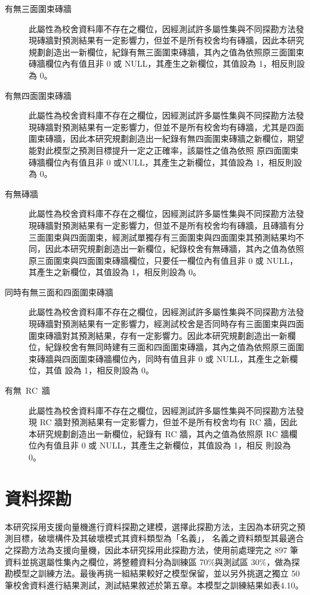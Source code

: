 \begin{description}
  \item[有無三面圍束磚牆]
  此屬性為校舍資料庫不存在之欄位，因經測試許多屬性集與不同探勘方法發現磚牆對預測結果有一定影響力，但並不是所有校舍均有磚牆，因此本研究規劃創造出一新欄位，紀錄有無三面圍束磚牆，其內之值為依照原三面圍束磚牆欄位內有值且非 0 或 NULL，其產生之新欄位，其值設為 1，相反則設為 0。
  \item[有無四面圍束磚牆]
  此屬性為校舍資料庫不存在之欄位，因經測試許多屬性集與不同探勘方法發現磚牆對預測結果有一定影響力，但並不是所有校舍均有磚牆，尤其是四面圍束磚牆，因此本研究規劃創造出一紀錄有無四面圍束磚牆之新欄位，期望能對此模型之預測目標提升一定之正確率，該屬性之值為依照 原四面圍束磚牆欄位內有值且非 0 或NULL，其產生之新欄位，其值設為 1，相反則設為 0。
  \item[有無磚牆]
  此屬性為校舍資料庫不存在之欄位，因經測試許多屬性集與不同探勘方法發現磚牆對預測結果有一定影響力，但並不是所有校舍均有磚牆，且磚牆有分三面圍束與四面圍束，經測試單獨存有三面圍束與四面圍束其預測結果均不同，因此本研究規劃創造出一新欄位，紀錄校舍有無磚牆，其內之值為依照原三面圍束與四面圍束磚牆欄位，只要任一欄位內有值且非 0 或 NULL，其產生之新欄位，其值設為 1，相反則設為 0。
  \item[同時有無三面和四面圍束磚牆]
  此屬性為校舍資料庫不存在之欄位，因經測試許多屬性集與不同探勘方法發現磚牆對預測結果有一定影響力，經測試校舍是否同時存有三面圍束與四面圍束磚牆對其預測結果，存有一定影響力。因此本研究規劃創造出一新欄位，紀錄校舍有無同時建有三面和四面圍束磚牆，其內之值為依照原三面圍束磚牆與四面圍束磚牆欄位內，同時有值且非 0 或 NULL，其產生之新欄位，其值 設為 1，相反則設為 0。
  \item[有無~RC~牆]
  此屬性為校舍資料庫不存在之欄位，因經測試許多屬性集與不同探勘方法發現 RC 牆對預測結果有一定影響力，但並不是所有校舍均有 RC 牆，因此本研究規劃創造出一新欄位，紀錄有 RC 牆，其內之值為依照原 RC 牆欄位內有值且非 0 或 NULL，其產生之新欄位，其值設為 1，相反 則設為 0。
\end{description}

\section{資料探勘}

本研究採用支援向量機進行資料探勘之建模，選擇此探勘方法，主因為本研究之預測目標，破壞構件及其破壞模式其資料類型為「名義」， 名義之資料類型其最適合之探勘方法為支援向量機，因此本研究採用此探勘方法，使用前處理完之 897 筆資料並挑選屬性集內之欄位，將整體資料分為訓練區 70\%與測試區 30\%，做為探勘模型之訓練方法。最後再挑一組結果較好之模型保留，並以另外挑選之獨立 50 筆校舍資料進行結果測試，測試結果敘述於第五章。本模型之訓練結果如表4.10。


